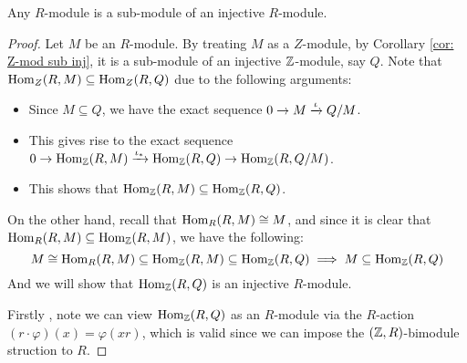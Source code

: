 \begin{thm}
    Any $R$-module is a sub-module of an injective $R$-module.
\end{thm}
\begin{proof}
    Let $M$ be an $R$-module. By treating $M$ as a $Z$-module, by Corollary \ref{cor: Z-mod sub inj}, it is a sub-module of an injective ${\mathbb Z}$-module, say $Q$. Note that $\operatorname{Hom}_Z(R,M) \subseteq \operatorname{Hom}_Z(R,Q)$ due to the following arguments:
    \begin{itemize}
        \item Since $M\subseteq Q$, we have the exact sequence $0\to M \xrightarrow{\iota} Q/M$.
        \item This gives rise to the exact sequence $0 \to \operatorname{Hom}_{\mathbb Z}(R,M) \xrightarrow{\iota_*} \operatorname{Hom}_{\mathbb Z}(R,Q) \to \operatorname{Hom}_{\mathbb Z}(R,Q/M)$. 
        \item This shows that $\operatorname{Hom}_{\mathbb Z}(R,M) \subseteq \operatorname{Hom}_{\mathbb Z}(R,Q)$.
    \end{itemize}
    On the other hand, recall that $\operatorname{Hom}_R(R,M) \cong M$, and since it is clear that $\operatorname{Hom}_R(R,M) \subseteq \operatorname{Hom}_{\mathbb Z}(R,M)$, we have the following:
    \[M\cong \operatorname{Hom}_R(R,M)\subseteq \operatorname{Hom}_{\mathbb Z}(R,M) \subseteq \operatorname{Hom}_{\mathbb Z}(R,Q) \implies M\subseteq \operatorname{Hom}_{\mathbb Z}(R,Q)\]
    And we will show that $\operatorname{Hom}_{\mathbb Z}(R,Q)$ is an injective $R$-module.
    
    Firstly , note we can view $\operatorname{Hom}_{\mathbb Z}(R,Q)$ as an $R$-module via the $R$-action $(r\cdot \varphi)(x) = \varphi(xr)$, which is valid since we can impose the $({\mathbb Z},R)$-bimodule struction to $R$. 
    

\end{proof}
